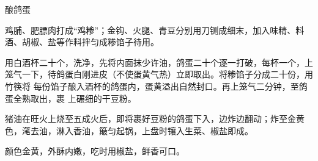 %
%
%
%
%
%
%
\begin{recipe}{酿鸽蛋}

\ingredients


\preparation

\step 鸡脯、肥膘肉打成“鸡糁”；金钩、火腿、青豆分别用刀铡成细末，加入味精、料
酒、胡椒、盐等作料拌匀成糁馅子待用。

\step 用白酒杯二十个，洗净，先将内面抹少许油，鸽蛋二十个逐一打破，每杯一个，上
笼气一下，待鸽蛋白刚进皮（不使蛋黄气热）立即取出。将糁馅子分成二十份，用竹筷将
每份馅子酿入酒杯的鸽蛋内，蛋黄溢出自然封口。再上笼气二分钟，至鸽蛋全熟取出，裹
上碾细的干豆粉。

\step 猪油在旺火上烧至五成火后，即将裹好豆粉的鸽蛋下入，边炸边翻动；炸至金黄
色，滗去油，淋入香油，簸匀起锅，上盘时镶入生菜、椒盐即成。

\features

颜色金黄，外酥内嫩，吃时用椒盐，鲜香可口。

\end{recipe}

